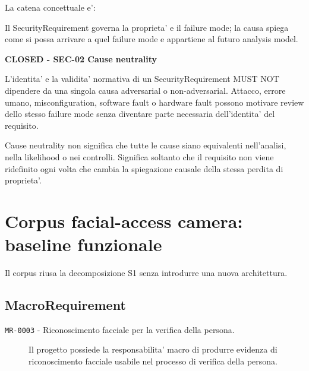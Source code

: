 \documentclass[11pt,a4paper]{article}
\newcommand{\closed}{\textbf{CLOSED}}
\newenvironment{resultbox}[1]{%
  \def\FrameCommand{\fcolorbox{ddtagreen}{ddtagray}}%
  \MakeFramed{\advance\hsize-2\width\FrameRestore}
  \noindent\textbf{#1}\par\smallskip
}{\endMakeFramed}
\begin{document}
La catena concettuale e':

\begin{center}
\end{center}

Il SecurityRequirement governa la proprieta' e il failure mode; la causa spiega come si possa arrivare a quel failure mode e appartiene al futuro analysis model.

\begin{resultbox}{\closed{} - SEC-02 Cause neutrality}
L'identita' e la validita' normativa di un SecurityRequirement MUST NOT dipendere da una singola causa adversarial o non-adversarial. Attacco, errore umano, misconfiguration, software fault o hardware fault possono motivare review dello stesso failure mode senza diventare parte necessaria dell'identita' del requisito.
\end{resultbox}

Cause neutrality non significa che tutte le cause siano equivalenti nell'analisi, nella likelihood o nei controlli. Significa soltanto che il requisito non viene ridefinito ogni volta che cambia la spiegazione causale della stessa perdita di proprieta'.

\section{Corpus facial-access camera: baseline funzionale}

Il corpus riusa la decomposizione S1 senza introdurre una nuova architettura.

\subsection{MacroRequirement}

\begin{description}
  \item[\texttt{MR-0003} - Riconoscimento facciale per la verifica della persona.] Il progetto possiede la responsabilita' macro di produrre evidenza di riconoscimento facciale usabile nel processo di verifica della persona.
\end{description}
\end{document}
